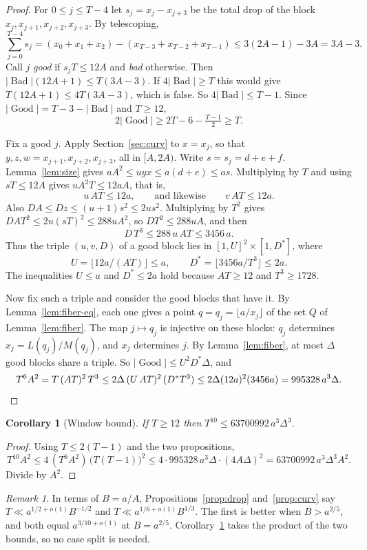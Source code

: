\documentclass[11pt]{amsart}
\newtheorem{corollary}[theorem]{Corollary}
\theoremstyle{definition}
\theoremstyle{remark}
\newtheorem{remark}[theorem]{Remark}
\DeclareMathOperator{\Good}{Good}
\DeclareMathOperator{\Bad}{Bad}
\begin{document}
\begin{proof}
For $0\le j\le T-4$ let $s_j=x_j-x_{j+3}$ be the total drop of the block
$x_j,x_{j+1},x_{j+2},x_{j+3}$. By telescoping,
\[
\sum_{j=0}^{T-4}s_j=(x_0+x_1+x_2)-(x_{T-3}+x_{T-2}+x_{T-1})\le 3(2A-1)-3A=3A-3 .
\]
Call $j$ \emph{good} if $s_jT\le 12A$ and \emph{bad} otherwise. Then
$|\Bad|(12A+1)\le T(3A-3)$. If $4|\Bad|\ge T$ this would give $T(12A+1)\le 4T(3A-3)$, which is
false. So $4|\Bad|\le T-1$. Since $|\Good|=T-3-|\Bad|$ and $T\ge12$,
\[
2|\Good|\ge 2T-6-\tfrac{T-1}2\ge T .
\]

Fix a good $j$. Apply Section~\ref{sec:curv} to $x=x_j$, so that $y,z,w=x_{j+1},x_{j+2},x_{j+3}$, all
in $[A,2A)$. Write $s=s_j=d+e+f$. Lemma~\ref{lem:size} gives $uA^2\le uyx\le a(d+e)\le as$.
Multiplying by $T$ and using $sT\le 12A$ gives $uA^2T\le 12aA$, that is,
\[
u\,AT\le 12a,\qquad\text{and likewise}\qquad v\,AT\le 12a .
\]
Also $DA\le Dz\le(u+1)s^2\le 2us^2$. Multiplying by $T^2$ gives
$DAT^2\le 2u(sT)^2\le 288uA^2$, so $DT^2\le 288uA$, and then
\[
D\,T^3\le 288\,u\,AT\le 3456\,a .
\]
Thus the triple $(u,v,D)$ of a good block lies in $[1,U]^2\times[1,D^*]$, where
\[
U=\lfloor 12a/(AT)\rfloor\le a,\qquad D^*=\lfloor 3456a/T^3\rfloor\le 2a .
\]
The inequalities $U\le a$ and $D^*\le 2a$ hold because $AT\ge12$ and $T^3\ge1728$.

Now fix such a triple and consider the good blocks that have it. By Lemma~\ref{lem:fiber-eq},
each one gives a point $q=q_j=\lfloor a/x_j\rfloor$ of the set $Q$ of Lemma~\ref{lem:fiber}.
The map $j\mapsto q_j$ is injective on these blocks: $q_j$ determines $x_j=L(q_j)/M(q_j)$, and
$x_j$ determines $j$. By Lemma~\ref{lem:fiber}, at most $\Delta$ good blocks share a triple.
So $|\Good|\le U^2D^*\Delta$, and
\[
T^6A^2=T\,(AT)^2\,T^3\le 2\Delta\,(U\,AT)^2\,(D^*T^3)\le 2\Delta(12a)^2(3456a)=995328\,a^3\Delta.
\qedhere
\]
\end{proof}

\begin{corollary}[Window bound]\label{cor:window}
If $T\ge12$ then $T^{10}\le 63700992\,a^3\Delta^3$.
\end{corollary}

\begin{proof}
Using $T\le 2(T-1)$ and the two propositions,
\[
T^{10}A^2\le 4\,(T^6A^2)\,\bigl(T(T-1)\bigr)^2\le 4\cdot 995328\,a^3\Delta\cdot(4A\Delta)^2
=63700992\,a^3\Delta^3A^2 .
\]
Divide by $A^2$.
\end{proof}

\begin{remark}
In terms of $B=a/A$, Propositions~\ref{prop:drop} and~\ref{prop:curv} say
$T\ll a^{1/2+o(1)}B^{-1/2}$ and $T\ll a^{1/6+o(1)}B^{1/3}$. The first is better when
$B>a^{2/5}$, and both equal $a^{3/10+o(1)}$ at $B=a^{2/5}$. Corollary~\ref{cor:window} takes
the product of the two bounds, so no case split is needed.
\end{remark}
\end{document}
